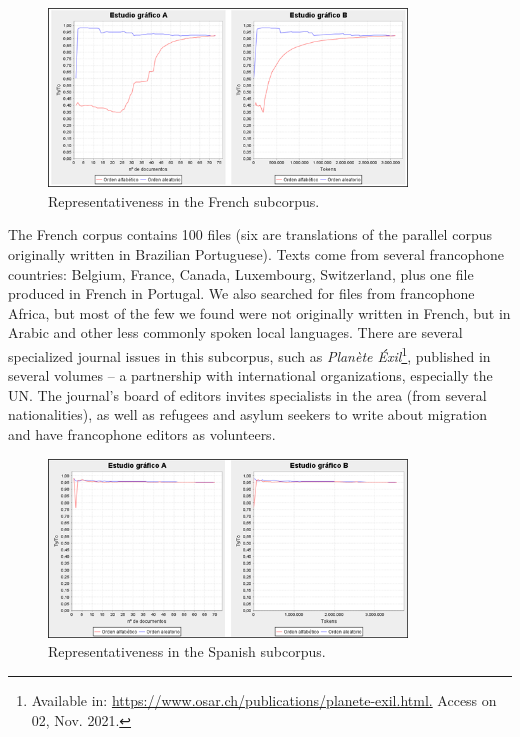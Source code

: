 \documentclass[english]{textolivre}
\begin{document}
\begin{figure}[htbp]
\centering
\includegraphics[width=0.85\textwidth]{Figura07.png}
\caption{Representativeness in the French subcorpus. }
\label{Figura07}
\end{figure}

The French corpus contains 100 files (six are translations of the parallel corpus originally written in Brazilian Portuguese). Texts come from several francophone countries: Belgium, France, Canada, Luxembourg, Switzerland, plus one file produced in French in Portugal. We also searched for files from francophone Africa, but most of the few we found were not originally written in French, but in Arabic and other less commonly spoken local languages. There are several specialized journal issues in this subcorpus, such as \textit{Planète Éxil}\footnote{Available in: \url{https://www.osar.ch/publications/planete-exil.html.} Access on 02, Nov. 2021.}, published in several volumes – a partnership with international organizations, especially the UN. The journal’s board of editors invites specialists in the area (from several nationalities), as well as refugees and asylum seekers to write about migration and have francophone editors as volunteers.

\begin{figure}[htbp]
\centering
\includegraphics[width=0.85\textwidth]{Figura08.png}
\caption{Representativeness in the Spanish subcorpus.}
\label{Figura08}
\end{figure}
\end{document}
